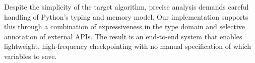 Despite the simplicity of the target algorithm, precise analysis demands careful handling of Python's typing and memory model. Our implementation supports this through a combination of expressiveness in the type domain and selective annotation of external APIs. The result is an end-to-end system that enables lightweight, high-frequency checkpointing with no manual specification of which variables to save.
